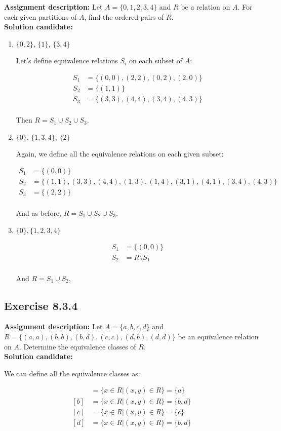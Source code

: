 \documentclass{report}
\newcommand{\mAlign}[1]{\begin{align*}#1\end{align*}}
\newcommand{\In}{\! \in \!}
\newcommand{\AssignmentDescription}{\textbf{Assignment description: }}
\newcommand{\Solution}{\textbf{Solution candidate: }}
\newcommand{\Exercise}[1]{\subsection{Exercise #1}}
\newcommand{\defaultEnumerateLabel}{\textbf{\alph*.}}
\begin{document}
	\AssignmentDescription
	Let $A=\{0,1,2,3,4\}$ and $R$ be a relation on $A$. For each given partitions of $A$, find the ordered pairs of $R$.\\
	
	\Solution
	
	\begin{enumerate}[label=\defaultEnumerateLabel]
		\item $\{0,2\}$, $\{1\}$, $\{3,4\}$
		
		Let's define equivalence relations $S_i$ on each subset of $A$:
		
		\mAlign{S_1&= \{(0,0),(2,2),(0,2),(2,0)\} \\ S_2 &= \{(1,1)\} \\ S_3 &= \{(3,3),(4,4),(3,4),(4,3)\} \\}
		
		Then $R = S_1 \cup S_2 \cup S_3$.
		
		
		\item $\{0\}$, $ \{1,3,4\} $, $ \{2\} $
		
		Again, we define all the equivalence relations on each given subset:
		
		\mAlign{S_1&= \{(0,0)\} \\ S_2 &= \{(1,1),(3,3),(4,4),(1,3),(1,4),(3,1),(4,1),(3,4),(4,3)\} \\ S_3 &= \{(2,2)\} \\}
		
		And as before, $R = S_1 \cup S_2 \cup S_3$.
		
		
		\item $\{0\},\{1,2,3,4\}$
		
		\mAlign{S_1&= \{(0,0)\} \\ S_2 &= R \setminus S_1 \\}
		
		And $R = S_1 \cup S_2$,
	\end{enumerate}
	
	\Exercise{8.3.4}
	
	\AssignmentDescription
	Let $A=\{a,b,c,d\}$ and $R=\{(a,a),(b,b), (b,d),(c,c),(d,b),(d,d)\}$ be an equivalence relation on $A$. Determine the equivalence classes of $R$.\\
	
	\Solution
	
	We can define all the equivalence classes as:
	
	\mAlign{[a] &= \{x \in R | (x,y) \In R\} = \{a\} \\
					[b] &= \{x \in R | (x,y) \In R\} = \{b,d\} \\
					[c] &= \{x \in R | (x,y) \In R\} = \{c\} \\
					[d] &= \{x \in R | (x,y) \In R\} = \{b,d\}}
	
\end{document}
